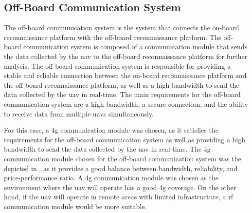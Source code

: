 
\subsection{Off-Board Communication System}\label{subsec:off-board_communication_system}

The off-board communication system is the system that connects the on-board reconnaissance platform with the off-board reconnaissance platform. The off-board communication system is composed of a communication module that sends the data collected by the \gls{uav} to the off-board reconnaissance platform for further analysis. The off-board communication system is responsible for providing a stable and reliable connection between the on-board reconnaissance platform and the off-board reconnaissance platform, as well as a high bandwidth to send the data collected by the \gls{uav} in real-time. The main requirements for the off-board communication system are a high bandwidth, a secure connection, and the ability to receive data from multiple \glspl{uav} simultaneously.

For this case, a \gls{4g} communication module was chosen, as it satisfies the requirements for the off-board communication system as well as providing a high bandwidth to send the data collected by the \gls{uav} in real-time. The \gls{4g} communication module chosen for the off-board communication system was the  depicted in , as it provides a good balance between bandwidth, reliability, and price-performance ratio. A \gls{4g} communication module was chosen as the environment where the \gls{uav} will operate has a good \gls{4g} coverage. On the other hand, if the \gls{uav} will operate in remote areas with limited infrastructure, a \gls{rf} communication module would be more suitable.


